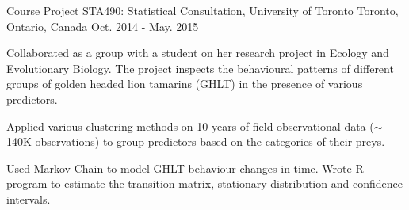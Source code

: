 

\begin{cventries}

  \cventry
    {Course Project} %
    {STA490: Statistical Consultation, University of Toronto} %
    {Toronto, Ontario, Canada} %
    {Oct. 2014 - May. 2015} %
    {
      \begin{cvitems} %
        \item {Collaborated as a group with a student on her research project in Ecology and Evolutionary Biology. The project inspects the behavioural patterns of different groups of golden headed lion tamarins (GHLT) in the presence of various predictors.}\\ 
        \begin{cvitems} 
          \item {Applied various clustering methods on 10 years of field observational data ($\sim$140K observations) to group predictors based on the categories of their preys.}
          \item {Used Markov Chain to model GHLT behaviour changes in time. Wrote R program to estimate the transition matrix, stationary distribution and confidence intervals.}\\
        \end{cvitems}
      \end{cvitems}
    }

\end{cventries}
